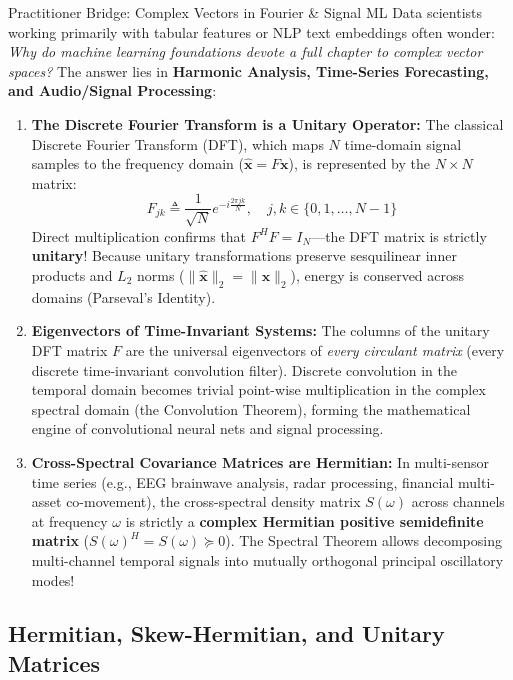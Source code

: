 \begin{intuitionbox}{Practitioner Bridge: Complex Vectors in Fourier \& Signal ML}
Data scientists working primarily with tabular features or NLP text embeddings often wonder: \emph{Why do machine learning foundations devote a full chapter to complex vector spaces?}
The answer lies in \textbf{Harmonic Analysis, Time-Series Forecasting, and Audio/Signal Processing}:
\begin{enumerate}
    \item \textbf{The Discrete Fourier Transform is a Unitary Operator:} The classical Discrete Fourier Transform (DFT), which maps $N$ time-domain signal samples to the frequency domain ($\hat{\mathbf{x}} = F \mathbf{x}$), is represented by the $N \times N$ matrix:
    \begin{equation*}
    F_{jk} \triangleq \frac{1}{\sqrt{N}} e^{-i \frac{2\pi j k}{N}}, \quad j, k \in \{0, 1, \dots, N-1\}
    \end{equation*}
    Direct multiplication confirms that $F^H F = I_N$—the DFT matrix is strictly \textbf{unitary}! Because unitary transformations preserve sesquilinear inner products and $L_2$ norms ($\|\hat{\mathbf{x}}\|_2 = \|\mathbf{x}\|_2$), energy is conserved across domains (Parseval's Identity).
    \item \textbf{Eigenvectors of Time-Invariant Systems:} The columns of the unitary DFT matrix $F$ are the universal eigenvectors of \emph{every circulant matrix} (every discrete time-invariant convolution filter). Discrete convolution in the temporal domain becomes trivial point-wise multiplication in the complex spectral domain (the Convolution Theorem), forming the mathematical engine of convolutional neural nets and signal processing.
    \item \textbf{Cross-Spectral Covariance Matrices are Hermitian:} In multi-sensor time series (e.g., EEG brainwave analysis, radar processing, financial multi-asset co-movement), the cross-spectral density matrix $S(\omega)$ across channels at frequency $\omega$ is strictly a \textbf{complex Hermitian positive semidefinite matrix} ($S(\omega)^H = S(\omega) \succeq 0$). The Spectral Theorem allows decomposing multi-channel temporal signals into mutually orthogonal principal oscillatory modes!
\end{enumerate}
\end{intuitionbox}


\subsection{Hermitian, Skew-Hermitian, and Unitary Matrices}

